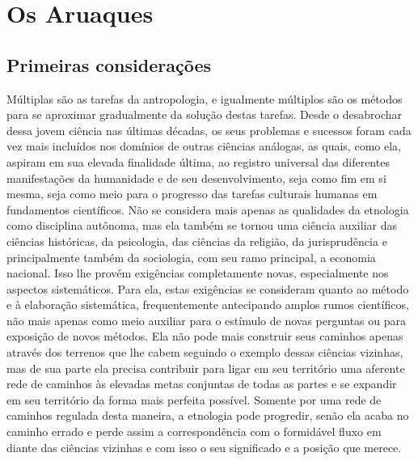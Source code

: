 

\part{Os Aruaques}

\chapter*{Primeiras considerações\smallskip{}}

Múltiplas são as tarefas da antropologia, e igualmente múltiplos são os
métodos para se aproximar gradualmente da solução destas tarefas. Desde
o desabrochar dessa jovem ciência nas últimas décadas, os seus problemas
e sucessos foram cada vez mais incluídos nos domínios de outras ciências
análogas, as quais, como ela, aspiram em sua elevada finalidade última,
ao registro universal das diferentes manifestações da humanidade e de
seu desenvolvimento, seja como fim em si mesma, seja como meio para o
progresso das tarefas culturais humanas em fundamentos científicos. Não
se considera mais apenas as qualidades da etnologia como disciplina
autônoma, mas ela também se tornou uma ciência auxiliar das ciências
históricas, da psicologia, das ciências da religião, da jurisprudência
e principalmente também da sociologia, com seu ramo principal, a
economia nacional. Isso lhe provém exigências completamente novas,
especialmente nos aspectos sistemáticos. Para ela, estas exigências se
consideram quanto ao método e à elaboração sistemática, frequentemente
antecipando amplos rumos científicos, não mais apenas como meio
auxiliar para o estímulo de novas perguntas ou para exposição de novos
métodos. Ela não pode mais construir seus caminhos apenas através dos
terrenos que lhe cabem seguindo o exemplo dessas ciências vizinhas, mas
de sua parte ela precisa contribuir para ligar em seu território uma
aferente rede de caminhos às elevadas metas conjuntas de todas as
partes e se expandir em seu território da forma mais perfeita possível.
Somente por uma rede de caminhos regulada desta maneira, a etnologia
pode progredir, senão ela acaba no caminho errado e perde assim a
correspondência com o formidável fluxo em diante das ciências vizinhas e
com isso o seu significado e a posição que merece.

